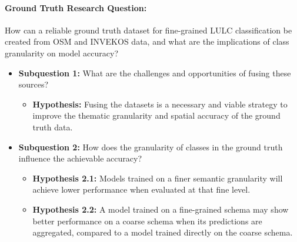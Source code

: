 \documentclass{report}
\begin{document}
\paragraph{Ground Truth Research Question:} How can a reliable ground truth dataset for fine-grained LULC classification be created from OSM and INVEKOS data, and what are the implications of class granularity on model accuracy?
\begin{itemize}
\item \textbf{Subquestion 1:} What are the challenges and opportunities of fusing these sources?
\begin{itemize}
\item \textbf{Hypothesis:} Fusing the datasets is a necessary and viable strategy to improve the thematic granularity and spatial accuracy of the ground truth data.
\end{itemize}
\item \textbf{Subquestion 2:} How does the granularity of classes in the ground truth influence the achievable accuracy?
\begin{itemize}
\item \textbf{Hypothesis 2.1:} Models trained on a finer semantic granularity will achieve lower performance when evaluated at that fine level.
\item \textbf{Hypothesis 2.2:} A model trained on a fine-grained schema may show better performance on a coarse schema when its predictions are aggregated, compared to a model trained directly on the coarse schema.
\end{itemize}
\end{itemize}
\end{document}
